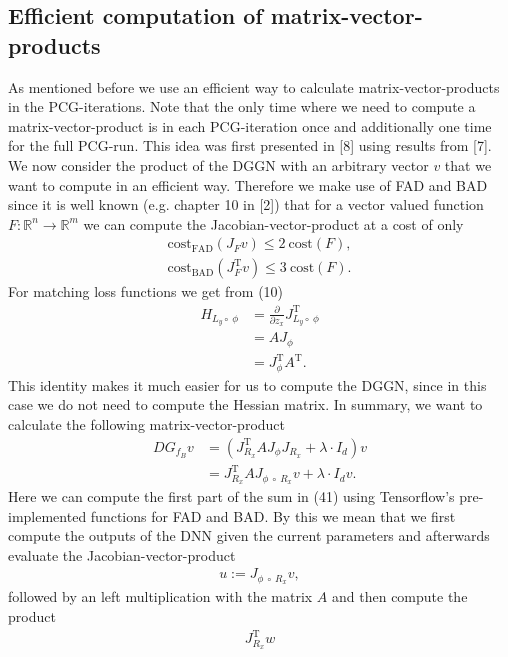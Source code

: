 \documentclass[conference]{IEEEtran}
\begin{document}
\subsection{Efficient computation of matrix-vector-products}
\noindent
As mentioned before we use an efficient way to calculate matrix-vector-products in the PCG-iterations. Note that the only time where we need to compute a matrix-vector-product is in each PCG-iteration once and additionally one time for the full PCG-run. This idea was first presented in [8] using results from [7].\\ 
We now consider the product of the DGGN with an arbitrary vector $v$ that we want to compute in an efficient way.
Therefore we make use of FAD and BAD since it is well known (e.g. chapter 10 in [2]) that for a vector valued function $F:\mathbb{R}^{n}\rightarrow\mathbb{R}^{m}$ we can compute the Jacobian-vector-product at a cost of only
\begin{align}
\mathrm{cost}_{\text{FAD}}(J_{F}v)\leq 2\:\mathrm{cost}(F),\\
\mathrm{cost}_{\text{BAD}}(J_{F}^{\mathrm{T}}v)\leq 3\:\mathrm{cost}(F).
\end{align}
For matching loss functions we get from (10)
\begin{align}
H_{L_{y}\circ\:\phi} &= \frac{\partial}{\partial z_{x}}J_{L_{y}\circ\:\phi}^{\mathrm{T}}\\
&= AJ_{\phi} \\
&= J_{\phi}^{\mathrm{T}}A^{\mathrm{T}}.
\end{align}
This identity makes it much easier for us to compute the DGGN, since in this case we do not need to compute the Hessian matrix. In summary, we want to calculate the following matrix-vector-product
\begin{align}
DG_{f_{B}}v &=  \left(J_{R_{x}}^{\mathrm{T}}AJ_{\phi}J_{R_{x}} + \lambda\cdot I_{d}\right)v\\
&= J_{R_{x}}^{\mathrm{T}}AJ_{\phi\:\circ\: R _{x}}v + \lambda\cdot I_{d}v.
\end{align}
Here we can compute the first part of the sum in (41) using Tensorflow's pre-implemented functions for FAD and BAD. By this we mean that we first compute the outputs of the DNN given the current parameters and afterwards evaluate the Jacobian-vector-product 
\begin{align}
u := J_{\phi\:\circ\: R _{x}}v,
\end{align}
followed by an left multiplication with the matrix $A$ and then compute the product 
\begin{align}
J_{R_{x}}^{\mathrm{T}}w
\end{align}
\end{document}
